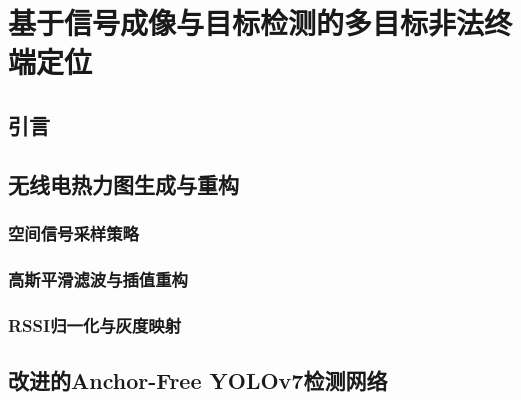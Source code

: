 \chapter{基于信号成像与目标检测的多目标非法终端定位}

\section{引言}


\section{无线电热力图生成与重构}

\subsection{空间信号采样策略}


\subsection{高斯平滑滤波与插值重构}


\subsection{RSSI归一化与灰度映射}



\section{改进的Anchor-Free YOLOv7检测网络}

